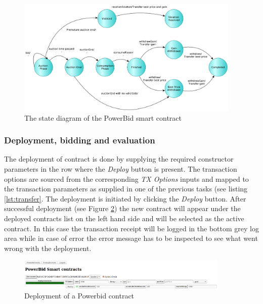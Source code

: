\documentclass[a4paper]{article}
\begin{document}
\begin{figure}[H]
    \centering
    \includegraphics[width=0.95\textwidth]{figures/state_diagram.png}
    \caption{The state diagram of the PowerBid smart contract}
    \label{fig:State-diagram-powerbid}
\end{figure}

\subsubsection{Deployment, bidding and evaluation}

The deployment of contract is done by supplying the required constructor parameters in the row where the \emph{Deploy} button is present. The transaction options are sourced from the corresponding \emph{TX Options} inputs and mapped to the transaction parameters as supplied in one of the previous tasks (see listing \ref{lst:transfer}. The deployment is initiated by clicking the \emph{Deploy} button. After successful deployment (see Figure \ref{fig:deploy-powerbid}) the new contract will appear under the deployed contracts list on the left hand side and will be selected as the active contract. In this case the transaction receipt will be logged in the bottom grey log area while in case of error the error message has to be inspected to see what went wrong with the deployment.


\begin{figure}[H]
    \centering
    \includegraphics[width=0.9\textwidth]{figures/ui-deploy.png}
    \caption{Deployment of a Powerbid contract}
    \label{fig:deploy-powerbid}
\end{figure}
\end{document}
